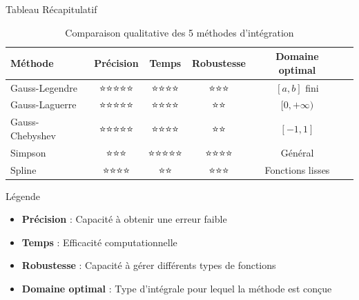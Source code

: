 \documentclass[aspectratio=169,11pt]{beamer}
\begin{document}
\begin{frame}{Tableau Récapitulatif}
\vspace{-0.3cm}
\begin{table}[h]
\centering
\tiny
\renewcommand{\arraystretch}{1.3}
\begin{tabular}{p{2.5cm}ccccp{3.5cm}}
\toprule
\textbf{Méthode} & \textbf{Précision} & \textbf{Temps} & \textbf{Robustesse} & \textbf{Domaine optimal} \\
\midrule
Gauss-Legendre & ⭐⭐⭐⭐⭐ & ⭐⭐⭐⭐ & ⭐⭐⭐ & $[a,b]$ fini \\
\midrule
Gauss-Laguerre & ⭐⭐⭐⭐⭐ & ⭐⭐⭐⭐ & ⭐⭐ & $[0,+\infty)$ \\
\midrule
Gauss-Chebyshev & ⭐⭐⭐⭐⭐ & ⭐⭐⭐⭐ & ⭐⭐ & $[-1,1]$ \\
\midrule
Simpson & ⭐⭐⭐ & ⭐⭐⭐⭐⭐ & ⭐⭐⭐⭐ & Général \\
\midrule
Spline & ⭐⭐⭐⭐ & ⭐⭐ & ⭐⭐⭐ & Fonctions lisses \\
\bottomrule
\end{tabular}
\caption{\footnotesize Comparaison qualitative des 5 méthodes d'intégration}
\label{tab:comparaison}
\end{table}

\vspace{-0.2cm}
\begin{block}{Légende}
\tiny
\begin{itemize}
\item \textbf{Précision} : Capacité à obtenir une erreur faible
\item \textbf{Temps} : Efficacité computationnelle
\item \textbf{Robustesse} : Capacité à gérer différents types de fonctions
\item \textbf{Domaine optimal} : Type d'intégrale pour lequel la méthode est conçue
\end{itemize}
\end{block}
\end{frame}
\end{document}
